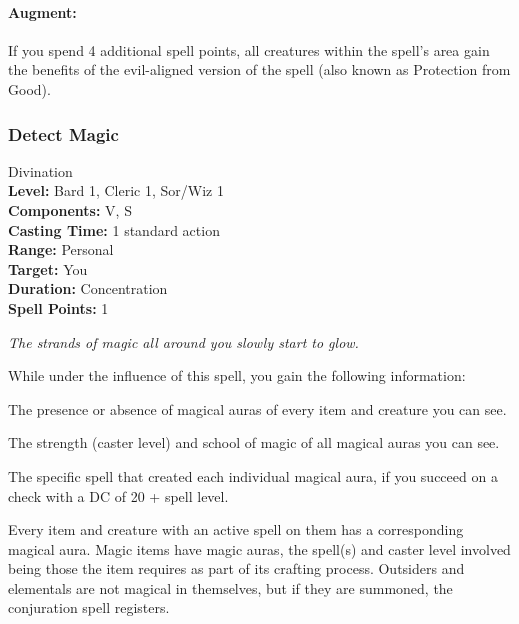\paragraph{Augment:} If you spend 4 additional spell points, all creatures within the spell's area gain the benefits of the evil-aligned version of the
 spell (also known as Protection from Good).
\subsubsection{Detect Magic}
\label{Spell:DetectMagic}
Divination
\\ \textbf{Level:} Bard 1, Cleric 1, Sor/Wiz 1
\\ \textbf{Components:} V, S
\\ \textbf{Casting Time:} 1 standard action
\\ \textbf{Range:} Personal
\\ \textbf{Target:} You
\\ \textbf{Duration:} Concentration
\\ \textbf{Spell Points:} 1

\emph{The strands of magic all around you slowly start to glow.}

While under the influence of this spell, you gain the following information:
\begin{list}{}{\leftmargin=1em}
 \item The presence or absence of magical auras of every item and creature you can see.
 \item The strength (caster level) and school of magic of all magical auras you can see.
 \item The specific spell that created each individual magical aura, if you succeed on a  check with a DC of 20 + spell level. 
\end{list}
Every item and creature with an active spell on them has a corresponding magical aura. 
Magic items have magic auras, the spell(s) and caster level involved being those the item requires as part of its crafting process.
Outsiders and elementals are not magical in themselves, but if they are summoned, the conjuration spell registers.

